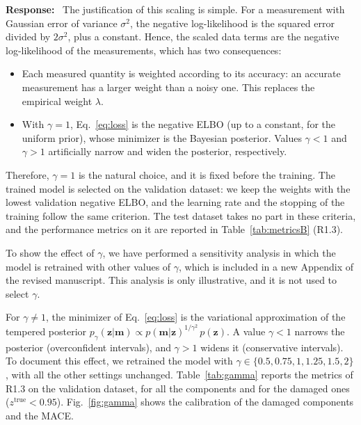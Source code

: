 \documentclass[11pt]{article}
\newenvironment{response}{\par\smallskip\noindent\color{resp}\textbf{Response:}\ }{\par}
\newcommand{\m}{\mathbf{m}}
\newcommand{\z}{\mathbf{z}}
\begin{document}
\begin{response}
The justification of this scaling is simple.
For a measurement with Gaussian error of variance $\sigma^2$, the negative log-likelihood is the squared error divided by $2\sigma^2$, plus a constant.
Hence, the scaled data terms are the negative log-likelihood of the measurements, which has two consequences:
\begin{itemize}[leftmargin=*]
\item Each measured quantity is weighted according to its accuracy: an accurate measurement has a larger weight than a noisy one. This replaces the empirical weight $\lambda$.
\item With $\gamma=1$, Eq.~\eqref{eq:loss} is the negative ELBO (up to a constant, for the uniform prior), whose minimizer is the Bayesian posterior. Values $\gamma<1$ and $\gamma>1$ artificially narrow and widen the posterior, respectively.
\end{itemize}
Therefore, $\gamma=1$ is the natural choice, and it is fixed before the training.
The trained model is selected on the validation dataset: we keep the weights with the lowest validation negative ELBO, and the learning rate and the stopping of the training follow the same criterion.
The test dataset takes no part in these criteria, and the performance metrics on it are reported in Table~\ref{tab:metricsB} (R1.3).

To show the effect of $\gamma$, we have performed a sensitivity analysis in which the model is retrained with other values of $\gamma$, which is included in a new Appendix of the revised manuscript.
This analysis is only illustrative, and it is not used to select $\gamma$.

For $\gamma\neq1$, the minimizer of Eq.~\eqref{eq:loss} is the variational approximation of the tempered posterior $p_\gamma(\z|\m)\propto p(\m|\z)^{1/\gamma^2}\,p(\z)$.
A value $\gamma<1$ narrows the posterior (overconfident intervals), and $\gamma>1$ widens it (conservative intervals).
To document this effect, we retrained the model with $\gamma\in\{0.5,0.75,1,1.25,1.5,2\}$, with all the other settings unchanged.
Table~\ref{tab:gamma} reports the metrics of R1.3 on the validation dataset, for all the components and for the damaged ones ($z^{\text{true}}<0.95$).
Fig.~\ref{fig:gamma} shows the calibration of the damaged components and the MACE.


\end{response}
\end{document}
